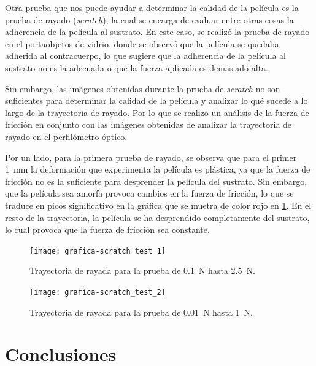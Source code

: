 \documentclass[12pt]{IEEEtran}
\begin{document}
%
Otra prueba que nos puede ayudar a determinar la calidad de la película es la prueba de rayado (\emph{scratch}), la cual se encarga de evaluar entre otras cosas la adherencia de la película al sustrato. En este caso, se realizó la prueba de rayado en el portaobjetos de vidrio, donde se observó que la película se quedaba adherida al contracuerpo, lo que sugiere que la adherencia de la película al sustrato no es la adecuada o que la fuerza aplicada es demasiado alta.

Sin embargo, las imágenes obtenidas durante la prueba de \emph{scratch} no son suficientes para determinar la calidad de la película y analizar lo qué sucede a lo largo de la trayectoria de rayado. Por lo que se realizó un análisis de la fuerza de fricción en conjunto con las imágenes obtenidas de analizar la trayectoria de rayado en el perfilómetro óptico.

Por un lado, para la primera prueba de rayado, se observa que para el primer \qty{1}{\mm} la deformación que experimenta la película es plástica, ya que la fuerza de fricción no es la suficiente para desprender la película del sustrato. Sin embargo, que la película sea amorfa provoca cambios en la fuerza de fricción, lo que se traduce en picos significativo en la gráfica que se muetra de color rojo en \cref{fig:scratch-test-1}. En el resto de la trayectoria, la película se ha desprendido completamente del sustrato, lo cual provoca que la fuerza de fricción sea constante.

\begin{figure}[htb]
	\centering
	\texttt{[image: grafica-scratch\_test\_1]}
	\caption{Trayectoria de rayada para la prueba de \qty{0.1}{\N} hasta \qty{2.5}{\N}.}
	\label{fig:scratch-test-1}
\end{figure}%
\vspace{0.5cm}
\begin{figure}[htb]
	\centering
	\texttt{[image: grafica-scratch\_test\_2]}
	\caption{Trayectoria de rayada para la prueba de \qty{0.01}{\N} hasta \qty{1}{\N}.}
	\label{fig:scratch-test-2}
\end{figure}




\section{Conclusiones}
\kant[5]


\nocite{*}
\printbibliography
\end{document}
